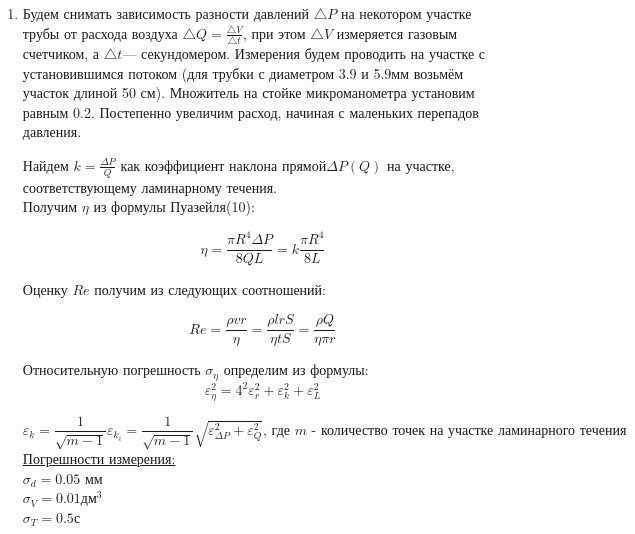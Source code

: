 \documentclass[10pt]{article}
\begin{document}
\begin{enumerate}

    \item  Будем снимать зависимость разности давлений $\bigtriangleup P$ на некотором участке трубы от расхода воздуха $\bigtriangleup Q = \frac{\bigtriangleup V}{\bigtriangleup t}$, при этом $\bigtriangleup V$ измеряется газовым счетчиком, а $\bigtriangleup t$— секундомером. Измерения будем проводить на участке с установившимся потоком (для трубки с диаметром 3.9 и 5.9мм возьмём участок длиной 50 см). Множитель на стойке микроманометра установим равным 0.2. Постепенно увеличим расход, начиная с маленьких перепадов давления.

    Найдем $k = \frac{\Delta P} {Q}$ как коэффициент наклона прямой$\Delta P(Q)$ на участке, соответствующему ламинарному течения. \\
    Получим $\eta$ из формулы Пуазейля(10):
    
    \begin{equation}
        \eta = \frac {\pi R ^ 4 \Delta P}{8 QL} = k \frac {\pi R ^ 4 }{8 L}
    \end{equation}
    
    Оценку $Re$ получим из следующих соотношений:

    \begin{equation}    
        Re = \frac{\rho vr}{\eta} = \frac{\rho lrS}{\eta tS} = \frac{\rho Q}{\eta \pi r}
    \end{equation}
    
    Относительную погрешность $\sigma_\eta$ определим из формулы:
    \begin{equation}
        \varepsilon_\eta^ 2 =  4^2 \varepsilon_r ^ 2 +  \varepsilon_{k} ^ 2 + \varepsilon_L ^ 2
    \end{equation}
    
    \begin{equation}    
        \varepsilon_k = \frac{1}{\sqrt{m-1}} \varepsilon_{k_{i}} = \frac{1}{\sqrt{m-1}} \sqrt{\varepsilon_{\Delta P}^2 + \varepsilon_{Q}^2}
        \text{, где } m \text{ - количество точек на участке ламинарного течения}
    \end{equation}          
    \underline{Погрешности измерения:}\\
    $\sigma_d = 0.05 $ мм \\
    $\sigma_V = 0.01  \text{дм}^3$  \\
    $\sigma_T = 0.5$с \\


\end{enumerate}
\end{document}
